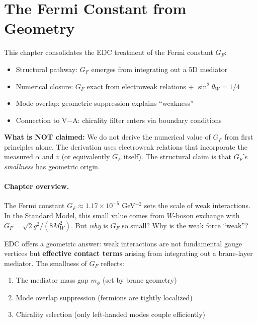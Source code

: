
\section{The Fermi Constant from Geometry}
\label{sec:ch11_gf}

\begin{tcolorbox}[edcGuardrail, title=\textbf{Epistemic Status}]
This chapter consolidates the EDC treatment of the Fermi constant $G_F$:
\begin{itemize}[nosep]
    \item Structural pathway: $G_F$ emerges from integrating out a 5D mediator \tagDc{}
    \item Numerical closure: $G_F$ exact from electroweak relations + $\sin^2\theta_W = 1/4$ \tagDc{}
    \item Mode overlap: geometric suppression explains ``weakness'' \tagP{}
    \item Connection to V$-$A: chirality filter enters via boundary conditions \tagDc{}
\end{itemize}
\textbf{What is NOT claimed:} We do not derive the numerical value of $G_F$
from first principles alone. The derivation uses electroweak relations that
incorporate the measured $\alpha$ and $v$ (or equivalently $G_F$ itself).
The structural claim is that $G_F$'s \emph{smallness} has geometric origin.
\end{tcolorbox}


\paragraph{Chapter overview.}
The Fermi constant $G_F \approx 1.17 \times 10^{-5}$ GeV$^{-2}$ sets the scale of
weak interactions. In the Standard Model, this small value comes from $W$-boson
exchange with $G_F = \sqrt{2}g^2/(8M_W^2)$. But \emph{why} is $G_F$ so small?
Why is the weak force ``weak''?

EDC offers a geometric answer: weak interactions are not fundamental gauge vertices
but \textbf{effective contact terms} arising from integrating out a brane-layer
mediator. The smallness of $G_F$ reflects:
\begin{enumerate}[nosep]
    \item The mediator mass gap $m_\phi$ (set by brane geometry)
    \item Mode overlap suppression (fermions are tightly localized)
    \item Chirality selection (only left-handed modes couple efficiently)
\end{enumerate}

